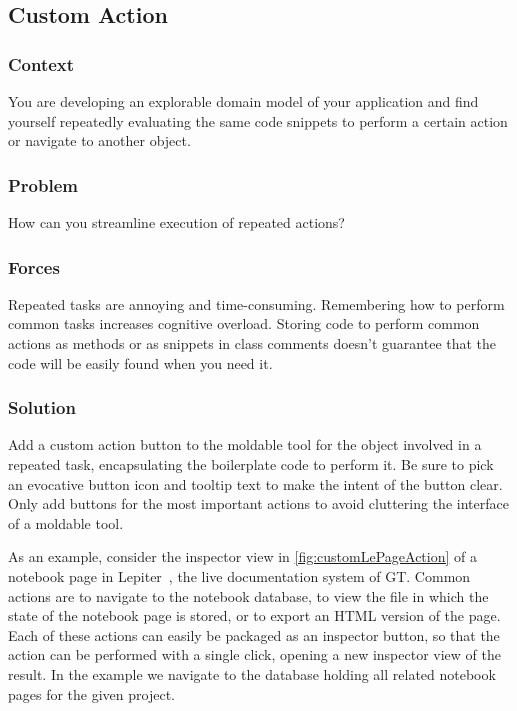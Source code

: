 \documentclass[sigconf]{acmart}
\begin{document}
\subsection*{Custom Action}\label{pat:customAction}
\subsubsection*{Context}
You are developing an explorable domain model of your application and find yourself repeatedly evaluating the same code snippets to perform a certain action or navigate to another object.

\subsubsection*{Problem}
How can you streamline execution of repeated actions?

\subsubsection*{Forces}
Repeated tasks are annoying and time-consuming.
Remembering how to perform common tasks increases cognitive overload.
Storing code to perform common actions as methods or as snippets in class comments doesn't guarantee that the code will be easily found when you need it.

\subsubsection*{Solution}
Add a custom action button to the moldable tool for the object involved in a repeated task, encapsulating the boilerplate code to perform it.
Be sure to pick an evocative button icon and tooltip text to make the intent of the button clear.
Only add buttons for the most important actions to avoid cluttering the interface of a moldable tool.

As an example, consider the inspector view in \autoref{fig:customLePageAction} of a notebook page in Lepiter~\cite{Girb21a}, the live documentation system of GT.
Common actions are to navigate to the notebook database, to view the file in which the state of the notebook page is stored, or to export an HTML version of the page.
Each of these actions can easily be packaged as an inspector button, so that the action can be performed with a single click, opening a new inspector view of the result.
In the example we navigate to the database holding all related notebook pages for the given project.
\end{document}
